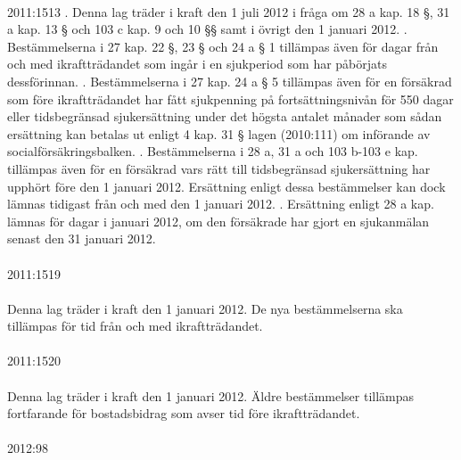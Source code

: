 \documentclass[a4paper,notitlepage,openany,10pt]{book}
\begin{document}
\paragraph*{}
2011:1513
. Denna lag träder i kraft den 1 juli 2012 i fråga om 28 a kap. 18 §, 31 a kap. 13 § och 103 c kap. 9 och 10 §§ samt i övrigt den 1 januari 2012.
. Bestämmelserna i 27 kap. 22 §, 23 § och 24 a § 1 tillämpas även för dagar från och med ikraftträdandet som ingår i en sjukperiod som har påbörjats dessförinnan.
. Bestämmelserna i 27 kap. 24 a § 5 tillämpas även för en försäkrad som före ikraftträdandet har fått sjukpenning på fortsättningsnivån för 550 dagar eller tidsbegränsad sjukersättning under det högsta antalet månader som sådan ersättning kan betalas ut enligt 4 kap. 31 § lagen (2010:111) om införande av socialförsäkringsbalken.
. Bestämmelserna i 28 a, 31 a och 103 b-103 e kap. tillämpas även för en försäkrad vars rätt till tidsbegränsad sjukersättning har upphört före den 1 januari 2012. Ersättning enligt dessa bestämmelser kan dock lämnas tidigast från och med den 1 januari 2012.
. Ersättning enligt 28 a kap. lämnas för dagar i januari 2012, om den försäkrade har gjort en sjukanmälan senast den 31 januari 2012.
\paragraph*{}
2011:1519
\paragraph*{}
Denna lag träder i kraft den 1 januari 2012. De nya bestämmelserna ska tillämpas för tid från och med ikraftträdandet.
\paragraph*{}
2011:1520
\paragraph*{}
Denna lag träder i kraft den 1 januari 2012. Äldre bestämmelser tillämpas fortfarande för bostadsbidrag som avser tid före ikraftträdandet.
\paragraph*{}
2012:98
\end{document}
